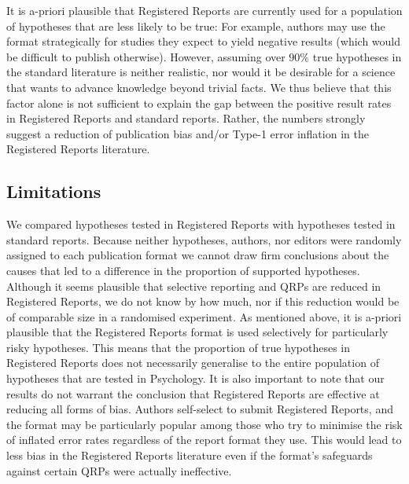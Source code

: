\documentclass[british,,jou,floatsintext]{apa6}
\begin{document}
It is a-priori plausible that Registered Reports are currently used for a population of hypotheses that are less likely to be true:
For example, authors may use the format strategically for studies they expect to yield negative results (which would be difficult to publish otherwise).
However, assuming over \(90\%\) true hypotheses in the standard literature is neither realistic, nor would it be desirable for a science that wants to advance knowledge beyond trivial facts.
We thus believe that this factor alone is not sufficient to explain the gap between the positive result rates in Registered Reports and standard reports.
Rather, the numbers strongly suggest a reduction of publication bias and/or Type-1 error inflation in the Registered Reports literature.

\hypertarget{limitations}{%
\subsection{Limitations}\label{limitations}}

We compared hypotheses tested in Registered Reports with hypotheses tested in standard reports.
Because neither hypotheses, authors, nor editors were randomly assigned to each publication format we cannot draw firm conclusions about the causes that led to a difference in the proportion of supported hypotheses.
Although it seems plausible that selective reporting and QRPs are reduced in Registered Reports, we do not know by how much, nor if this reduction would be of comparable size in a randomised experiment.
As mentioned above, it is a-priori plausible that the Registered Reports format is used selectively for particularly risky hypotheses.
This means that the proportion of true hypotheses in Registered Reports does not necessarily generalise to the entire population of hypotheses that are tested in Psychology.
It is also important to note that our results do not warrant the conclusion that Registered Reports are effective at reducing all forms of bias.
Authors self-select to submit Registered Reports, and the format may be particularly popular among those who try to minimise the risk of inflated error rates regardless of the report format they use.
This would lead to less bias in the Registered Reports literature even if the format's safeguards against certain QRPs were actually ineffective.
\end{document}
